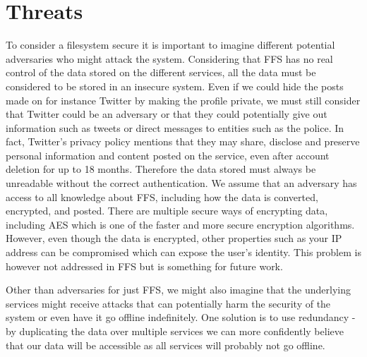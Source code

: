 \section{Threats}
To consider a filesystem secure it is important to imagine different potential adversaries who might attack the system. Considering that FFS has no real control of the data stored on the different services, all the data must be considered to be stored in an insecure system. Even if we could hide the posts made on for instance Twitter by making the profile private, we must still consider that Twitter could be an adversary or that they could potentially give out information such as tweets or direct messages to entities such as the police. In fact, Twitter's privacy policy mentions that they may share, disclose and preserve personal information and content posted on the service, even after account deletion for up to 18 months\cite{TwitterPrivacyPolicy}. Therefore the data stored must always be unreadable without the correct authentication. We assume that an adversary has access to all knowledge about FFS, including how the data is converted, encrypted, and posted. There are multiple secure ways of encrypting data, including AES which is one of the faster and more secure encryption algorithms\cite{mahajanStudyEncryptionAlgorithms2013}. However, even though the data is encrypted, other properties such as your IP address can be compromised which can expose the user's identity. This problem is however not addressed in FFS but is something for future work.

Other than adversaries for just FFS, we might also imagine that the underlying services might receive attacks that can potentially harm the security of the system or even have it go offline indefinitely. One solution is to use redundancy - by duplicating the data over multiple services we can more confidently believe that our data will be accessible as all services will probably not go offline. 